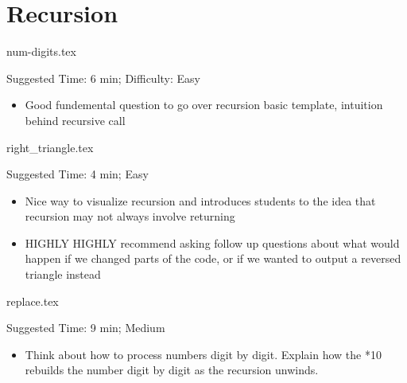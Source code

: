 \documentclass{exam}
\begin{document}
\section{Recursion}
\begin{questions}
    {num-digits.tex}
    \begin{questionmeta}
        Suggested Time: 6 min; Difficulty: Easy
        \begin{itemize}
            \item  Good fundemental question to go over recursion basic template, intuition behind recursive call
        \end{itemize}
      \end{questionmeta}    
      
      {right_triangle.tex}
      \begin{questionmeta}
          Suggested Time: 4 min; Easy
          \begin{itemize}
              \item  Nice way to visualize recursion and introduces students to the idea that recursion may not always involve returning
              \item HIGHLY HIGHLY recommend asking follow up questions about what would happen if we changed parts of the code, or if we wanted to output a reversed triangle instead
          \end{itemize}
        \end{questionmeta}

        {replace.tex}
        \begin{questionmeta}
            Suggested Time: 9 min; Medium
            \begin{itemize}
              \item  Think about how to process numbers digit by digit. Explain how the *10 rebuilds the number digit by digit as the recursion unwinds.
          \end{itemize}
        \end{questionmeta}
\end{questions}
\end{document}

